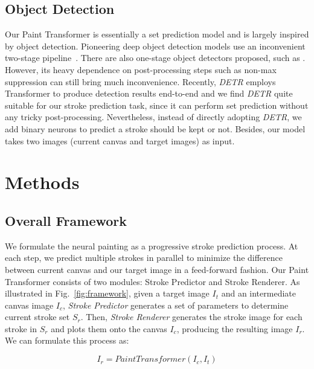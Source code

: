 \documentclass[10pt,twocolumn,letterpaper]{article}
\begin{document}
\subsection{Object Detection}
Our Paint Transformer is essentially a set prediction model and is largely inspired by object detection. 
Pioneering deep object detection models use an inconvenient two-stage pipeline~\cite{ren2015faster}. There are also one-stage object detectors proposed, such as \cite{yolo,redmon2016look,tian2019fcos}.
However, its heavy dependence on post-processing steps such as non-max suppression can still bring much inconvenience. 
Recently, \textit{DETR} \cite{carion2020endtoend} employs Transformer \cite{vaswani2017attention} to produce detection results end-to-end and we find \textit{DETR} quite suitable for our stroke prediction task, since it can perform set prediction without any tricky post-processing. Nevertheless, instead of directly adopting \textit{DETR}, we add binary neurons to predict a stroke should be kept or not. Besides, our model takes two images (current canvas and target images) as input.  




\section{Methods}





\subsection{Overall Framework}

We formulate the neural painting as a progressive stroke prediction process. At each step, we predict multiple strokes in parallel to minimize the difference between current canvas and our target image in a feed-forward fashion.
Our Paint Transformer consists of two modules: Stroke Predictor and Stroke Renderer.
As illustrated in Fig.~\ref{fig:framework},
given a target image $I_t$ and an intermediate canvas image $I_c$, \emph{Stroke Predictor} generates a set of parameters to determine current stroke set $S_r$.
Then, \emph{Stroke Renderer} generates the stroke image for each stroke in $S_r$ and plots them onto the canvas $I_c$, producing the resulting image $I_r$. We can formulate this process as:


\begin{equation}
I_r = PaintTransformer(I_c, I_t)
\end{equation}
\end{document}
